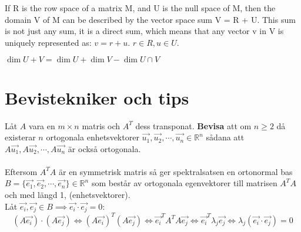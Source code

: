 \documentclass{report}
\begin{document}

{
	If R is the row space of a matrix M, and U is the null space of M, then the domain
	V of M can be described by the vector space sum V = R + U. 
	This sum is not just any sum, it is a direct sum, which means that any vector v in V 
	is uniquely represented as: $v = r + u$. $r \in R, u \in U$.
}

{
	$\dim U+V = \dim U + \dim V - \dim U \cap V$
}

\pagebreak
\chapter{Bevistekniker och tips}
{
	Låt $A$ vara en $m \times n$ matris och $A^T$ dess transponat. \textbf{Bevisa} att om $n \geq 2$ då existerar $n$ ortogonala enhetsvektorer $\vec{u_1}, \vec{u_2}, \cdots, \vec{u_n} \in \mathbb{R}^n$ sådana att $A\vec{u_1}, A\vec{u_2}, \cdots, A\vec{u_n}$ är också ortogonala.\\\\
	
	Eftersom $A^T A$ är en symmetrisk matris så ger spektralsatsen en ortonormal bas $B = \{\vec{e_1}, \vec{e_2}, \cdots, \vec{e_n}\} \in \mathbb{R}^n$ som består av ortogonala egenvektorer till matrisen $A^T A$ och med längd 1, (enhetsvektorer).\\
	Låt $\vec{e_i}, \vec{e_j} \in B \implies \vec{e_i} \cdot \vec{e_j} = 0$:\\

\begin{equation*}
	(A\vec{e_i}) \cdot (A\vec{e_j}) \iff (A\vec{e_i})^T (A\vec{e_j}) \iff \vec{e_i}^T A^T A \vec{e_j} \iff \vec{e_i}^T \lambda_j \vec{e_j} \iff \lambda_j (\vec{e_i} \cdot \vec{e_j}) = 0
\end{equation*}
}
\end{document}

